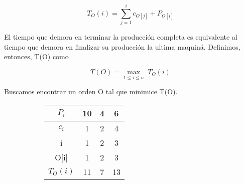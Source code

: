 $$ T_{O}(i) = \sum_{j = 1}^{i}{c_{O[j]}} + P_{O[i]}$$
 
El tiempo que demora en terminar la producci\'on completa es equivalente al tiempo que demora en finalizar su producci\'on la ultima maquin\'a. Definimos, entonces, T(O) como

$$T(O) = {\displaystyle\max_{1 \leq i \leq n}\;  T_{O}(i)}$$

Buscamos encontrar un orden O tal que minimice T(O).

\begin{figure}
    \begin{center}
        \begin{minipage}[c]{\figurewidth}
            \begin{center}
                
                \begin{subfigure}{.5\textwidth}
                    \centering
                    \begin{tabular}[c]{|c|c|c|c|}
                        \hline
                        $P_i$ & 10 & 4 & 6 \\
                        \hline
                        $c_i$ &  1 & 2 & 4  \\
                        \hline
                        \rowcolor[gray]{.9}
                        i & 1 & 2 & 3  \\
                        \hline
                        \rowcolor[gray]{.9}
                        O[i] & 1 & 2 & 3  \\
                        \hline
                    		\rowcolor[gray]{.9}
                        $T_{O}(i)$ & 11 & 7 & 13  \\
                        \hline
                    \end{tabular}
                    \caption{ }
                    \label{fig:ej1nooptimo}
                \vspace{2ex}
                \end{subfigure}
                

\end{center}
\end{minipage}
\end{center}
\end{figure}
